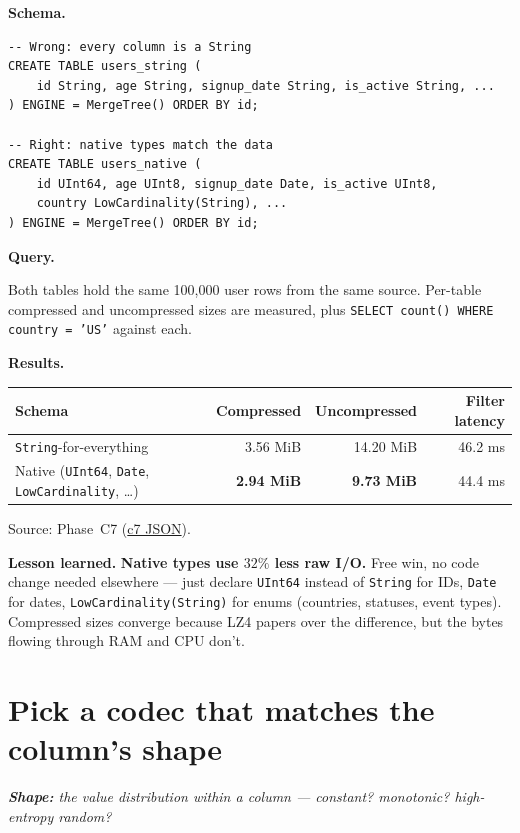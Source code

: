 \documentclass[11pt]{article}
\renewcommand{\arraystretch}{1.15}
\newcommand{\shape}[1]{%
  \par\noindent\textit{\textbf{Shape:} #1}\par\smallskip}
\newcommand{\schemaHd}{%
  \par\smallskip\noindent\textbf{\color{accentblue}Schema.}\par\nopagebreak\smallskip}
\newcommand{\queryHd}{%
  \par\smallskip\noindent\textbf{\color{accentblue}Query.}\par\nopagebreak\smallskip}
\newcommand{\resultsHd}{%
  \par\smallskip\noindent\textbf{\color{accentblue}Results.}\par\nopagebreak\smallskip}
\newcommand{\lesson}[1]{%
  \par\medskip
  \begin{lessonbox}\textbf{\color{accentgreen}Lesson learned.}\enspace #1\end{lessonbox}}
\begin{document}
\schemaHd
\begin{lstlisting}
-- Wrong: every column is a String
CREATE TABLE users_string (
    id String, age String, signup_date String, is_active String, ...
) ENGINE = MergeTree() ORDER BY id;

-- Right: native types match the data
CREATE TABLE users_native (
    id UInt64, age UInt8, signup_date Date, is_active UInt8,
    country LowCardinality(String), ...
) ENGINE = MergeTree() ORDER BY id;
\end{lstlisting}

\queryHd
Both tables hold the same 100{,}000 user rows from the same source.
Per-table compressed and uncompressed sizes are measured, plus
\texttt{SELECT count() WHERE country = 'US'} against each.

\resultsHd
\renewcommand{\arraystretch}{1.20}
\begin{tabularx}{\linewidth}{@{}X r r r@{}}
\toprule
\textbf{Schema} & \textbf{Compressed} & \textbf{Uncompressed} & \textbf{Filter latency}\\
\midrule
\texttt{String}-for-everything                          & 3.56 MiB & 14.20 MiB & 46.2 ms\\
\rowcolor{accentgreen!12}Native (\texttt{UInt64}, \texttt{Date}, \texttt{LowCardinality}, \ldots)
                                                        & \textbf{2.94 MiB} & \textbf{9.73 MiB} & 44.4 ms\\
\bottomrule
\end{tabularx}

\smallskip
Source: Phase~C7
(\href{run:results/experiment_c7_string_vs_native_20260503_192524.json}{c7 JSON}).

\lesson{%
\textbf{Native types use $32\%$ less raw I/O.} Free win, no code change
needed elsewhere — just declare \texttt{UInt64} instead of \texttt{String}
for IDs, \texttt{Date} for dates, \texttt{LowCardinality(String)} for
enums (countries, statuses, event types). Compressed sizes converge
because LZ4 papers over the difference, but the bytes flowing through
RAM and CPU don't.}

\section{Pick a codec that matches the column's shape}

\shape{the value distribution \emph{within} a column —
constant? monotonic? high-entropy random?}
\end{document}
